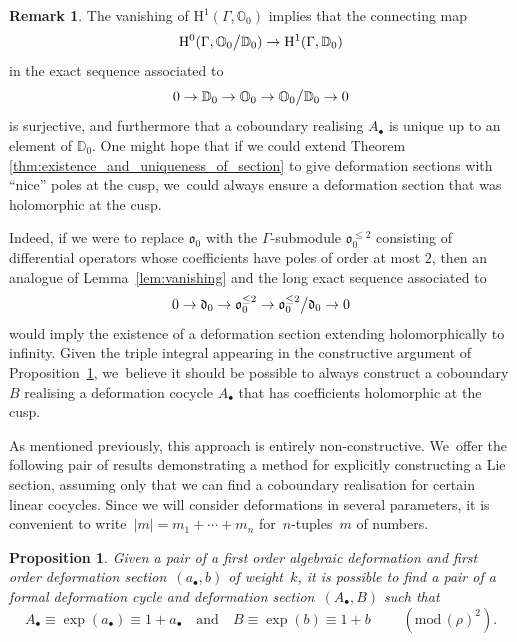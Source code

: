 \documentclass[10pt,a4paper]{article}
\numberwithin{equation}{section}
\let\oldbullet\bullet
\renewcommand{\bullet}{{\scriptscriptstyle\oldbullet}}
\theoremstyle{plain}
\newtheorem{proposition}[theoremcounter]{Proposition}
\theoremstyle{definition}
\newtheorem{remark}[theoremcounter]{Remark}
\newcommand{\tx}{\text}
\newcommand{\nbd}{\nobreakdash-\hspace{0pt}}
\newcommand{\bbD}{\ensuremath{\mathbb{D}}}
\newcommand{\bbO}{\ensuremath{\mathbb{O}}}
\newcommand{\frakd}{\ensuremath{\mathfrak{d}}}
\newcommand{\frako}{\ensuremath{\mathfrak{o}}}
\newcommand{\rmH}{\ensuremath{\mathrm{H}}}
\renewcommand{\pmod}[1]{\;(\mathrm{mod}\, #1)}
\let\Ga\Gamma
\begin{document}
\begin{remark}\label{rem:uniqueness}
The vanishing of $\rmH^1(\Ga,\bbO_0)$ implies that the connecting map
\begin{equation*}
\rmH^0(\Ga,\bbO_0\big\slash \bbD_0) \to \rmH^1(\Ga,\bbD_0)
\end{equation*}
in the exact sequence associated to
\[
0 \to \bbD_0 \to \bbO_0 \to \bbO_0\big\slash\bbD_0 \to 0\]
is surjective, and furthermore that a coboundary realising $A_\bullet$ is unique up to an element of $\bbD_0$. One might hope that if we could extend Theorem \ref{thm:existence_and_uniqueness_of_section} to give deformation sections with ``nice'' poles at the cusp, we~could always ensure a deformation section that was holomorphic at the cusp.

Indeed, if we were to replace $\frako_0$ with the $\Ga$\nbd{}submodule $\frako_0^{\leq 2}$ consisting of differential operators whose coefficients have poles of order at most $2$, then an analogue of Lemma~\ref{lem:vanishing} and the long exact sequence associated to
\[
0 \to \frakd_0 \to \frako_0^{\leq 2} \to \frako_0^{\leq 2}\big\slash \frakd_0 \to 0\]
would imply the existence of a deformation section extending holomorphically to infinity. Given the triple integral appearing in the constructive argument of Proposition~\ref{prop:extending_sections}, we~believe it should be possible to always construct a coboundary $B$ realising a deformation cocycle $A_\bullet$ that has coefficients holomorphic at the cusp.
\end{remark}

As mentioned previously, this approach is entirely non-constructive. We~offer the following pair of results demonstrating a method for explicitly constructing a Lie section, assuming only that we can find a coboundary realisation for certain linear cocycles. Since we will consider deformations in several parameters, it is convenient to write~$|m| = m_1 + \cdots + m_n$ for~$n$\nbd{}tuples~$m$ of numbers.


\begin{proposition}
\label{prop:extending_sections}
Given a pair of a \emph{first order} algebraic deformation and first order deformation section~$(a_\bullet,b)$ of weight~$k$, it is possible to find a pair of a \emph{formal} deformation cycle and deformation section~$(A_\bullet,B)$ such that
\begin{equation*}
A_\bullet \equiv \exp(a_\bullet) \equiv 1 + a_\bullet
\quad\text{and}\quad
B \equiv \exp(b) \equiv 1 + b
\qquad\pmod{(\rho)^2}
\tx{.}
\end{equation*}
\end{proposition}
\end{document}
